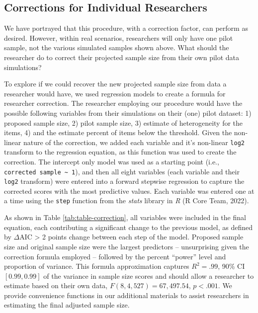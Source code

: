 \documentclass[
  man]{apa7}
\begin{document}
\hypertarget{corrections-for-individual-researchers}{%
\subsection{Corrections for Individual Researchers}\label{corrections-for-individual-researchers}}

We have portrayed that this procedure, with a correction factor, can perform as desired. However, within real scenarios, researchers will only have one pilot sample, not the various simulated samples shown above. What should the researcher do to correct their projected sample size from their own pilot data simulations?

To explore if we could recover the new projected sample size from data a researcher would have, we used regression models to create a formula for researcher correction. The researcher employing our procedure would have the possible following variables from their simulations on their (one) pilot dataset: 1) proposed sample size, 2) pilot sample size, 3) estimate of heterogeneity for the items, 4) and the estimate percent of items below the threshold. Given the non-linear nature of the correction, we added each variable and it's non-linear \texttt{log2} transform to the regression equation, as this function was used to create the correction. The intercept only model was used as a starting point (i.e., \texttt{corrected\ sample\ \textasciitilde{}\ 1}), and then all eight variables (each variable and their \texttt{log2} transform) were entered into a forward stepwise regression to capture the corrected scores with the most predictive values. Each variable was entered one at a time using the \texttt{step} function from the \emph{stats} library in \emph{R} (R Core Team, 2022).

As shown in Table \ref{tab:table-correction}, all variables were included in the final equation, each contributing a significant change to the previous model, as defined by \(\Delta\)AIC \textgreater{} 2 points change between each step of the model. Proposed sample size and original sample size were the largest predictors -- unsurprising given the correction formula employed -- followed by the percent ``power'' level and proportion of variance. This formula approximation captures \(R^2 = .99\), 90\% CI \([0.99, 0.99]\) of the variance in sample size scores and should allow a researcher to estimate based on their own data, \(F(8, 4,527) = 67,497.54\), \(p < .001\). We provide convenience functions in our additional materials to assist researchers in estimating the final adjusted sample size.
\end{document}
